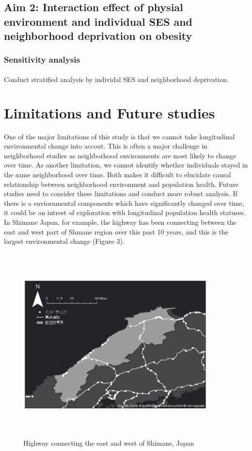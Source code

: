 \documentclass[12]{article}
\begin{document}
\subsection{Aim 2: Interaction effect of physial environment and individual SES and neighborhood deprivation on obesity}
\subsubsection{Sensitivity analysis}
\paragraph{}
Conduct stratified analysis by individal SES and neighborhood deprivation.  

\section{Limitations and Future studies}
\paragraph{}
One of the major limitations of this study is that we cannot take longitudinal environmental change into accout. This is often a major challenge in neighborhood studies as neighborhood environments are most likely to change over time. As another limitation, we cannot identify whether individuals stayed in the same neighborhood over time. Both makes it difficult to elucidate causal relationship between neighborhood environment and population health. Future studies need to consider these limitations and conduct more robust analysis. If there is a enviornmental components which have significantly changed over time, it could be an intrest of exploration with longitudinal population health statuses. In Shimane Japan, for example, the highway has been connecting between the east and west part of Shmane region over this past 10 years, and this is the largest environmental change (Figure 3).

\begin{figure}[h!]
\centering
\includegraphics[width=10cm,height=10cm,keepaspectratio]{graph/highway.jpg}
\caption{Highway connecting the east and west of Shimane, Japan}
\label{fig:highway}
\end{figure}
\end{document}
